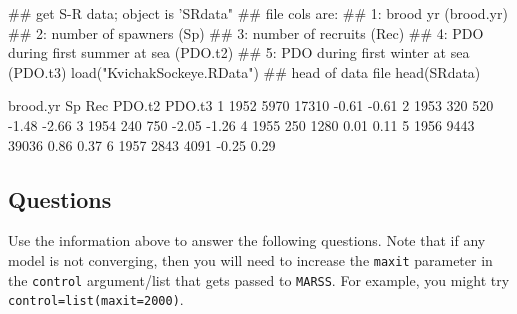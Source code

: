 \documentclass[10pt]{article}
\begin{document}
\begin{Schunk}
\begin{Sinput}
 ## get S-R data; object is 'SRdata"
 ## file cols are:
 ## 1: brood yr (brood.yr)
 ## 2: number of spawners (Sp)
 ## 3: number of recruits (Rec)
 ## 4: PDO during first summer at sea (PDO.t2)
 ## 5: PDO during first winter at sea (PDO.t3)
 load("KvichakSockeye.RData")
 ## head of data file
 head(SRdata)
\end{Sinput}
\begin{Soutput}
  brood.yr   Sp   Rec PDO.t2 PDO.t3
1     1952 5970 17310  -0.61  -0.61
2     1953  320   520  -1.48  -2.66
3     1954  240   750  -2.05  -1.26
4     1955  250  1280   0.01   0.11
5     1956 9443 39036   0.86   0.37
6     1957 2843  4091  -0.25   0.29
\end{Soutput}
\end{Schunk}

\subsection{Questions}

\noindent Use the information above to answer the following questions. Note that if any model is not converging, then you will need to increase the \texttt{maxit} parameter in the \texttt{control} argument/list that gets passed to \texttt{MARSS}. For example, you might try \texttt{control=list(maxit=2000)}.
\end{document}

